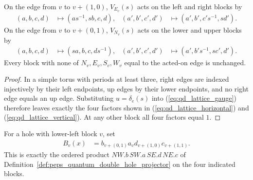 \begin{lemma}
    \label{lem:peps_qd_lattice_bond_support}
    On the edge from $v$ to $v+(1,0)$, $V_{E_v}(s)$ acts on the left and right blocks by
    \begin{align}
        (a,b,c,d)&\longmapsto(as^{-1},sb,c,d),
        & (a',b',c',d')&\longmapsto(a',b',c's^{-1},sd').
        \label{eq:qd_lattice_horizontal}
    \end{align}
    On the edge from $v$ to $v+(0,1)$, $V_{N_v}(s)$ acts on the lower and upper blocks by
    \begin{align}
        (a,b,c,d)&\longmapsto(sa,b,c,ds^{-1}),
        & (a',b',c',d')&\longmapsto(a',b's^{-1},sc',d').
        \label{eq:qd_lattice_vertical}
    \end{align}
    Every block with none of $N_v,E_v,S_v,W_v$ equal to the acted-on edge is unchanged.
\end{lemma}
\begin{proof}
    In a simple torus with periods at least three, right edges are indexed injectively by their left endpoints, up edges by their lower endpoints, and no right edge equals an up edge.
    Substituting $u=\delta_e(s)$ into (\ref{eq:qd_lattice_gauge}) therefore leaves exactly the four factors shown in (\ref{eq:qd_lattice_horizontal}) and (\ref{eq:qd_lattice_vertical}).
    At any other block all four factors equal $1$.
\end{proof}

\begin{definition}
    \label{def:peps_qd_lattice_hole}
    For a hole with lower-left block $v$, set
    \begin{align}
        B_v(x)&=b_{v+(0,1)}a_vd_{v+(1,0)}c_{v+(1,1)}.
        \label{eq:qd_lattice_hole}
    \end{align}
    This is exactly the ordered product $NW.b\,SW.a\,SE.d\,NE.c$ of Definition~\ref{def:peps_quantum_double_hole_projector} on the four indicated blocks.
\end{definition}

